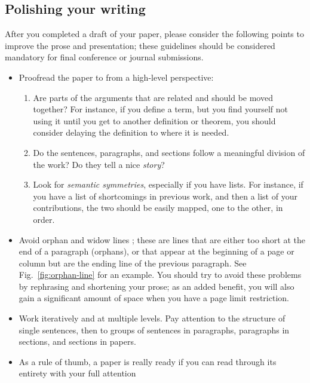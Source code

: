\documentclass[letterpaper, 10 pt, conference]{ieeeconf}
\begin{document}
\subsection{Polishing your writing}
After you completed a draft of your paper, please consider the following points to improve the prose and presentation; these guidelines should be considered mandatory for final conference or journal submissions.
\begin{itemize}
\item Proofread the paper to from a high-level perspective:
  \begin{enumerate}
  \item Are parts of the arguments that are related and should be moved together? For instance, if you define a term, but you find yourself not using it until you get to another definition or  theorem, you should consider delaying the definition to where it is needed.
  \item Do the sentences, paragraphs, and sections follow a meaningful division of the work? Do they tell a nice \emph{story}?
  \item Look for \emph{semantic symmetries}, especially if you have lists. For instance, if you have a list of shortcomings in previous work, and then a list of your contributions, the two should be easily mapped, one to the other, in order.
\end{enumerate}

\item Avoid orphan and widow lines \cite{WidowOrphanLines}; these are lines that are either too short at the end of a paragraph (orphans), or that appear at the beginning of a page or column but are the ending line of the previous paragraph. See Fig.~\ref{fig:orphan-line} for an example. You should try to avoid these problems by rephrasing and shortening your prose; as an added benefit, you will also gain a significant amount of space when you have a page limit restriction.
\item Work iteratively and at multiple levels. Pay attention to the structure of single sentences, then to groups of sentences in paragraphs, paragraphs in sections, and sections in papers.
\item As a rule of thumb, a paper is really ready if you can read through its entirety with your full attention
\end{itemize}
\end{document}
